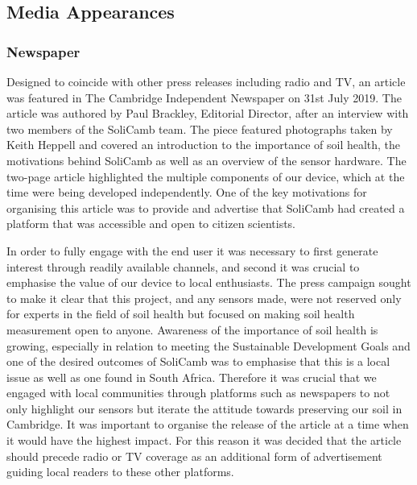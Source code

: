     \subsection{Media Appearances}
    
    \subsubsection{Newspaper}
        Designed to coincide with other press releases including radio and TV, an article was featured in The Cambridge Independent Newspaper on 31st July 2019. The article was authored by Paul Brackley, Editorial Director, after an interview with two members of the SoliCamb team. The piece featured photographs taken by Keith Heppell and covered an introduction to the importance of soil health, the motivations behind SoliCamb as well as an overview of the sensor hardware. 
        The two-page article highlighted the multiple components of our device, which at the time were being developed independently.  %
        One of the key motivations for organising this article was to provide and advertise that SoliCamb had created a platform that was accessible and open to citizen scientists.
        
        In order to fully engage with the end user it was necessary to first generate interest through readily available channels, and second it was crucial to emphasise the value of our device to local enthusiasts. The press campaign sought to make it clear that this project, and any sensors made, were not reserved only for experts in the field of soil health but focused on making soil health measurement open to anyone. Awareness of the importance of soil health is growing, especially in relation to meeting the Sustainable Development Goals \cite{Keesstra2016} and one of the desired outcomes of SoliCamb was to emphasise that this is a local issue as well as one found in South Africa. Therefore it was crucial that we engaged with local communities through platforms such as newspapers to not only highlight our sensors but iterate the attitude towards preserving our soil in Cambridge. 
        It was important to organise the release of the article at a time when it would have the highest impact. For this reason it was decided that the article should precede radio or TV coverage as an additional form of advertisement guiding local readers to these other platforms.
        
